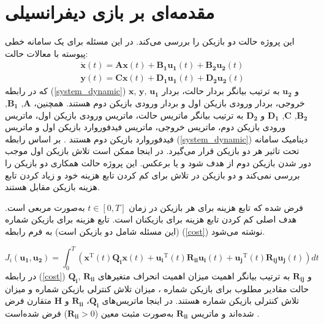 \section{ مقدمه‌ای بر بازی دیفرانسیلی}\label{diffgameover}

 این پروژه حالت دو بازیکن را بررسی می‌کند. در این مسئله برای یک سامانه خطی پیوسته با معالات حالت:
 \begin{equation}\label{system_dynamic}
 	\begin{split}
 		 	&\boldsymbol{\dot x}(t) = \boldsymbol{Ax}(t) + \boldsymbol{B_1u_1}(t) + \boldsymbol{B_2u_2}(t)%
 		\\
 		&\boldsymbol{y}(t) = \boldsymbol{Cx}(t) + \boldsymbol{D_1u_1}(t) + \boldsymbol{D_2u_2}(t)
 	\end{split}
 \end{equation}
که در رابطه (\ref{system_dynamic})
$\boldsymbol x$, $\boldsymbol y$, $\boldsymbol{u_1}$
و
$\boldsymbol{u_2}$
به ترتیب بیانگر بردار حالت، بردار خروجی، بردار ورودی بازیکن اول و بردار ورودی بازیکن دوم هستند. همچنین، 
$\boldsymbol A$, $\boldsymbol{B_1}$, $\boldsymbol {B_2}$, $\boldsymbol C$, $\boldsymbol {D_1}$
و
$\boldsymbol{D_2}$
به ترتیب بیانگر ماتریس حالت، ماتریس ورودی بازیکن اول، ماتریس ورودی بازیکن دوم، ماتریس خروجی، ماتریس فیدفوروارد بازیکن اول و ماتریس فیدفوروارد بازیکن دوم هستند
\cite{mct}.
بر اساس رابطه (\ref{system_dynamic}) دینامیک سامانه تحت تاثیر هر دو بازیکن قرار می‌گیرد. در اینجا ممکن است تلاش  بازیکن اول موجب دور شدن بازیکن دوم از هدف شود و یا برعکس.  این پروژه حالت همکاری دو بازیکن را بررسی نمی‌کند و دو بازیکن در تلاش برای کم کردن تابع هزینه خود و زیاد کردن تابع هزینه بازیکن مقابل هستند.


  فرض شده  که تابع هزینه برای هر بازیکن در زمان $t \in [0, T]$ به‌صورت مربعی است.
  هدف اصلی کم کردن تابع هزینه برای بازیکنان است. تابع هزینه برای بازیکن شماره   (این مسئله شامل دو بازیکن است) به فرم رابطه (\ref{cost}) نوشته می‌شود.

 \begin{equation}\label{cost}
 	J_i( \boldsymbol{u_1},  \boldsymbol{u_2}) = \int_{0}^{T}\left( \boldsymbol{x} ^\mathrm{T}(t) \boldsymbol{Q_i} \boldsymbol{x}(t)+
 	 \boldsymbol{u_i} ^\mathrm{T}(t) \boldsymbol{R_{ii}} \boldsymbol{u_i}(t)+
 	 \boldsymbol{u_j} ^\mathrm{T}(t)\boldsymbol{ R_{ij} u_j}(t)
 	\right)dt
  \end{equation}
در رابطه
(\ref{cost})
$\boldsymbol{Q_i}$, $\boldsymbol{R_{ii}}$
و
$\boldsymbol{R_{ij}}$
به ترتیب بیانگر اهمیت میزان اهمیت انحراف متغیرهای حالت مقادیر مطلوب برای بازیکن شماره ، میزان تلاش کنترلی بازیکن شماره  و میزان تلاش کنترلی بازیکن شماره   هستند.
در اینجا ماتریس‌های 
$\boldsymbol{Q_i}$، $\boldsymbol{R_{ii}}$
و
$\boldsymbol{H}$
متقارن فرض شده‌اند و ماتریس 
$\boldsymbol{R_{ii}}$
به‌صورت مثبت معین ($\boldsymbol{R_{ii}}>0$)
فرض شده‌است \cite{article1}.

